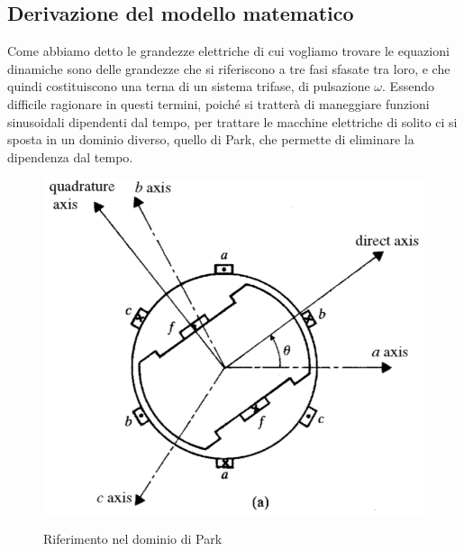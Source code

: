 \documentclass[Lau,noexaminfo]{sapthesis}
\begin{document}
	\subsection{Derivazione del modello matematico}
	Come abbiamo detto le grandezze elettriche di cui vogliamo trovare le equazioni dinamiche sono delle grandezze che si riferiscono a tre fasi sfasate tra loro, e che quindi costituiscono una terna di un sistema trifase, di pulsazione $\omega$. Essendo difficile ragionare in questi termini, poiché si tratterà di maneggiare funzioni sinusoidali dipendenti dal tempo, per trattare le macchine elettriche di solito ci si sposta in un dominio diverso, quello di Park, che permette di eliminare la dipendenza dal tempo.
	\begin{figure}
	\centering
	\includegraphics[height=0.30\textheight]{riferimento_park_pp}\\
	\caption{Riferimento nel dominio di Park}
	\end{figure}
\end{document}
